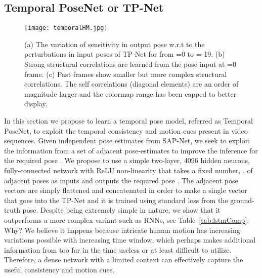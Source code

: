 \documentclass[runningheads]{llncs}
\begin{document}
\subsection{Temporal PoseNet or TP-Net}
\begin{figure*}[!h]
	\centering
	\texttt{[image: temporalHM.jpg]}
    \caption{(a) The variation of sensitivity in output pose w.r.t to the perturbations in input poses of TP-Net for from =0 to =-19. (b) Strong structural correlations are learned from the pose input at =0 frame. (c) Past frames show smaller but more complex structural correlations. The self correlations (diagonal elements) are an order of magnitude larger and the colormap range has been capped to better display.
    }
    \label{fig:tempInf}
    \vspace{-2em}
\end{figure*}

In this section we propose to learn a temporal pose model, referred as Temporal PoseNet, to exploit the temporal consistency and motion cues present in video sequences. Given independent pose estimates from SAP-Net, we seek to exploit the information from a set of adjacent pose-estimates  to improve the inference for the required pose . We propose to use a simple two-layer, 4096 hidden neurons, fully-connected network with ReLU non-linearity that takes a fixed number, , of adjacent poses as inputs and outputs the required pose . The adjacent pose vectors are simply flattened and concatenated in order to make a single vector that goes into the TP-Net and it is trained using standard  loss from the ground-truth pose. Despite being extremely simple in nature, we show that it outperforms a more complex variant such as RNNs, see Table~\ref{tab:lstmComp}. Why? We believe it happens because intricate human motion has increasing variations possible with increasing time window, which perhaps makes additional information from too far in the time useless or at least difficult to utilize. Therefore, a dense network with a limited context can effectively capture the useful consistency and motion cues. 
\end{document}
